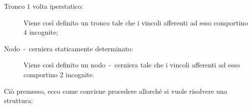\begin{description}
\item[Tronco $1$ volta iperstatico:] Viene così definito un tronco tale che i vincoli afferenti ad esso comportino $4$ incognite;
\item[Nodo~-~cerniera staticamente determinato:] Viene così definito un nodo~-~cerniera tale che i vincoli afferenti ad esso comportino $2$ incognite.
\end{description}
\noindent Ciò premesso, ecco come conviene procedere allorché si vuole risolvere una struttura:
